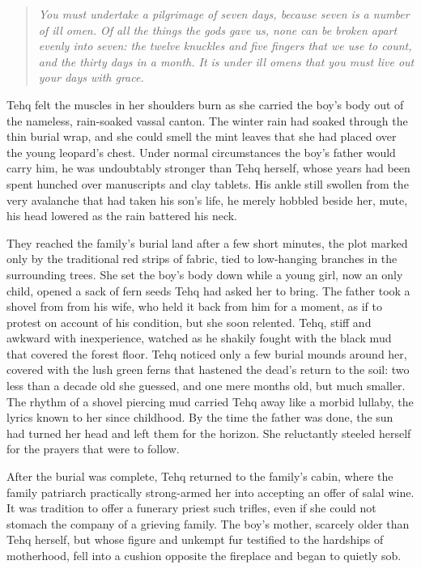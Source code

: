 \begin{quote}
\emph{You must undertake a pilgrimage of seven days, because seven is a number of ill omen. Of all the things the gods gave us, none can be broken apart evenly into seven: the twelve knuckles and five fingers that we use to count, and the thirty days in a month. It is under ill omens that you must live out your days with grace.}
\end{quote}

Tehq felt the muscles in her shoulders burn as she carried the boy's body out of the nameless, rain-soaked vassal canton. The winter rain had soaked through the thin burial wrap, and she could smell the mint leaves that she had placed over the young leopard's chest. Under normal circumstances the boy's father would carry him, he was undoubtably stronger than Tehq herself, whose years had been spent hunched over manuscripts and clay tablets. His ankle still swollen from the very avalanche that had taken his son's life, he merely hobbled beside her, mute, his head lowered as the rain battered his neck.

They reached the family's burial land after a few short minutes, the plot marked only by the traditional red strips of fabric, tied to low-hanging branches in the surrounding trees. She set the boy's body down while a young girl, now an only child, opened a sack of fern seeds Tehq had asked her to bring. The father took a shovel from from his wife, who held it back from him for a moment, as if to protest on account of his condition, but she soon relented. Tehq, stiff and awkward with inexperience, watched as he shakily fought with the black mud that covered the forest floor. Tehq noticed only a few burial mounds around her, covered with the lush green ferns that hastened the dead's return to the soil: two less than a decade old she guessed, and one mere months old, but much smaller. The rhythm of a shovel piercing mud carried Tehq away like a morbid lullaby, the lyrics known to her since childhood. By the time the father was done, the sun had turned her head and left them for the horizon. She reluctantly steeled herself for the prayers that were to follow.

After the burial was complete, Tehq returned to the family's cabin, where the family patriarch practically strong-armed her into accepting an offer of salal wine. It was tradition to offer a funerary priest such trifles, even if she could not stomach the company of a grieving family. The boy's mother, scarcely older than Tehq herself, but whose figure and unkempt fur testified to the hardships of motherhood, fell into a cushion opposite the fireplace and began to quietly sob.

